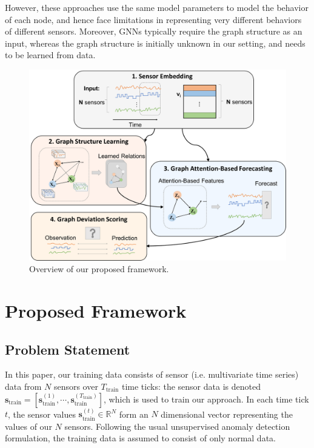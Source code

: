 \documentclass[letterpaper]{article} %
\newcommand{\Ttr}{T_\text{train}}
\begin{document}
However, these approaches use the same model parameters to model the behavior of each node, and hence face limitations in representing very different behaviors of different sensors. Moreover, GNNs typically require the graph structure as an input, whereas the graph structure is initially unknown in our setting, and needs to be learned from data.






\begin{figure}[t]
\centering
\includegraphics[width=.5\textwidth]{images/overview_fixed.pdf}
\caption{Overview of our proposed framework.}

\label{fig:framework}
\end{figure}


\section{Proposed Framework}

\subsection{Problem Statement}
In this paper, our training data consists of sensor (i.e. multivariate time series) data from $N$ sensors over $\Ttr$ time ticks: the sensor data is denoted $\mathbf{s}_\text{train} = \left[\mathbf{s}^{(1)}_\text{train}, \cdots,\mathbf{s}^{(\Ttr)}_\text{train}\right]$, which is used to train our approach. In each time tick $t$, the sensor values $\mathbf{s}^{(t)}_\text{train} \in \mathbb{R}^N$ form an $N$ dimensional vector representing the values of our $N$ sensors. Following the usual unsupervised anomaly detection formulation, the training data is assumed to consist of only normal data.
\end{document}
